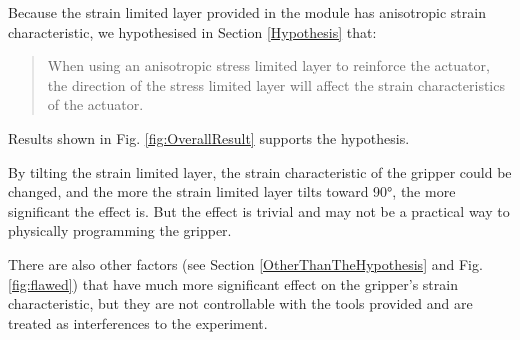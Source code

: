 \documentclass[conference]{IEEEtran}
\begin{document}
Because the strain limited layer provided in the module has anisotropic strain characteristic, we hypothesised in Section \ref{Hypothesis} that:

\begin{quote}
When using an anisotropic stress limited layer to reinforce the actuator, the direction of the stress limited layer will affect the strain characteristics of the actuator.
\end{quote}

Results shown in Fig. \ref{fig:OverallResult} supports the hypothesis. 

By tilting the strain limited layer, the strain characteristic of the gripper could be changed, and the more the strain limited layer tilts toward 90°, the more significant the effect is. But the effect is trivial and may not be a practical way to physically programming the gripper.


There are also other factors (see Section \ref{OtherThanTheHypothesis} and Fig. \ref{fig:flawed}) that have much more significant effect on the gripper's strain characteristic, but they are not controllable with the tools provided and are treated as interferences to the experiment.
\end{document}
